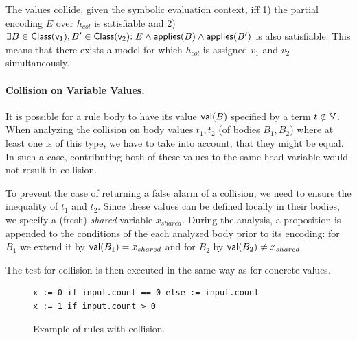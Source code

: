 The values collide, given the symbolic evaluation context, iff 1) the partial encoding $E$ over $h_{col}$ is satisfiable and 2) $\exists B \in \mathsf{Class(v_1)}, B' \in \mathsf{Class(v_2)}{:}\; E \land \mathsf{applies}(B) \land \mathsf{applies}(B')$ is also satisfiable.
This means that there exists a model for which $h_{col}$ is assigned $v_1$ and $v_2$ simultaneously.

\paragraph{Collision on Variable Values.}
It is possible for a rule body to have its value $\mathsf{val}(B)$ specified by a term $t \notin \mathbb{V}$.
When analyzing the collision on body values $t_1,t_2$ (of bodies $B_1,B_2$) where at least one is of this type, we have to take into account, that they might be equal.
In such a case, contributing both of these values to the same head variable would not result in collision.

To prevent the case of returning a false alarm of a collision, we need to ensure the inequality of $t_1$ and $t_2$.
Since these values can be defined locally in their bodies, we specify a (fresh) \emph{shared} variable $x_{shared}$.
During the analysis, a proposition is appended to the conditions of the each analyzed body prior to its encoding: for $B_1$ we extend it by $\mathsf{val}(B_1) = x_{shared}$ and for $B_2$ by $\mathsf{val}(B_2) \neq x_{shared}$

The test for collision is then executed in the same way as for concrete values.

\begin{figure}
  \caption{Example of \rego rules with collision.}
  \label{fig:colli:ex}
  \begin{lstlisting}[language=Rego]
x := 0 if input.count == 0 else := input.count
x := 1 if input.count > 0
\end{lstlisting}
\end{figure}

